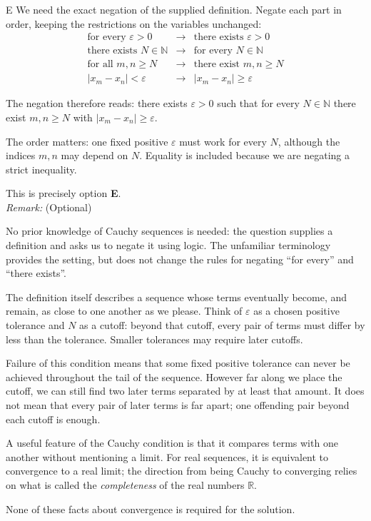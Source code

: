 \documentclass[11pt,a4paper]{article}
\begin{document}
\begin{enumerate}[label=\textbf{\arabic*.},leftmargin=*,itemsep=0pt,start=6]
\begin{djsSolution}{E}
We need the exact negation of the supplied definition. Negate each part in order, keeping the restrictions on the variables unchanged:
\[
\begin{array}{rcl}
\text{for every }\varepsilon>0
&\longrightarrow&
\text{there exists }\varepsilon>0\\[5pt]
\text{there exists }N\in\mathbb{N}
&\longrightarrow&
\text{for every }N\in\mathbb{N}\\[5pt]
\text{for all }m,n\ge N
&\longrightarrow&
\text{there exist }m,n\ge N\\[5pt]
|x_m-x_n|<\varepsilon
&\longrightarrow&
|x_m-x_n|\ge\varepsilon
\end{array}
\]

The negation therefore reads: there exists $\varepsilon>0$ such that for every $N\in\mathbb{N}$ there exist $m,n\ge N$ with $|x_m-x_n|\ge\varepsilon$.

The order matters: one fixed positive $\varepsilon$ must work for every $N$, although the indices $m,n$ may depend on $N$. Equality is included because we are negating a strict inequality.

This is precisely option \textbf{E}.\\[5pt]

\textit{Remark:} (Optional)

No prior knowledge of Cauchy sequences is needed: the question supplies a definition and asks us to negate it using logic. The unfamiliar terminology provides the setting, but does not change the rules for negating ``for every'' and ``there exists''.

The definition itself describes a sequence whose terms eventually become, and remain, as close to one another as we please. Think of $\varepsilon$ as a chosen positive tolerance and $N$ as a cutoff: beyond that cutoff, every pair of terms must differ by less than the tolerance. Smaller tolerances may require later cutoffs.

Failure of this condition means that some fixed positive tolerance can never be achieved throughout the tail of the sequence. However far along we place the cutoff, we can still find two later terms separated by at least that amount. It does not mean that every pair of later terms is far apart; one offending pair beyond each cutoff is enough.

A useful feature of the Cauchy condition is that it compares terms with one another without mentioning a limit. For real sequences, it is equivalent to convergence to a real limit; the direction from being Cauchy to converging relies on what is called the \emph{completeness} of the real numbers $\mathbb{R}$. 

None of these facts about convergence is required for the solution.
\end{djsSolution}
\end{enumerate}
\end{document}
